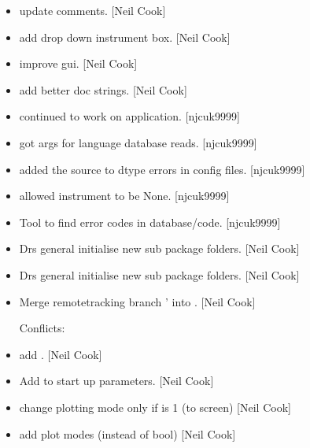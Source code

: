 \documentclass[a4paper,10pt,english]{report}
\begin{document}
\begin{itemize}
\item {} 
 \sphinxhyphen{} update comments. {[}Neil Cook{]}

\item {} 
 \sphinxhyphen{} add drop down instrument box. {[}Neil Cook{]}

\item {} 
 \sphinxhyphen{} improve gui. {[}Neil Cook{]}

\item {} 
 \sphinxhyphen{} add better doc strings. {[}Neil Cook{]}

\item {} 
 \sphinxhyphen{} continued to work on application. {[}njcuk9999{]}

\item {} 
 \sphinxhyphen{} got args for language database reads. {[}njcuk9999{]}

\item {} 
 \sphinxhyphen{} added the source to dtype errors in config
files. {[}njcuk9999{]}

\item {} 
 \sphinxhyphen{} allowed instrument to be None. {[}njcuk9999{]}

\item {} 
Tool to find error codes in database/code. {[}njcuk9999{]}

\item {} 
Drs general \sphinxhyphen{} initialise new sub package folders. {[}Neil Cook{]}

\item {} 
Drs general \sphinxhyphen{} initialise new sub package folders. {[}Neil Cook{]}

\item {} 
Merge remote\sphinxhyphen{}tracking branch ’ into .
{[}Neil Cook{]}
\begin{description}
\item[{Conflicts:}] \leavevmode
{}

\end{description}

\item {} 
 \sphinxhyphen{} add . {[}Neil Cook{]}

\item {} 
Add  to start up parameters. {[}Neil Cook{]}

\item {} 
 \sphinxhyphen{} change plotting mode \sphinxhyphen{} only if  is 1 (to
screen) {[}Neil Cook{]}

\item {} 
 \sphinxhyphen{} add plot modes (instead of bool) {[}Neil Cook{]}

\end{itemize}
\end{document}

